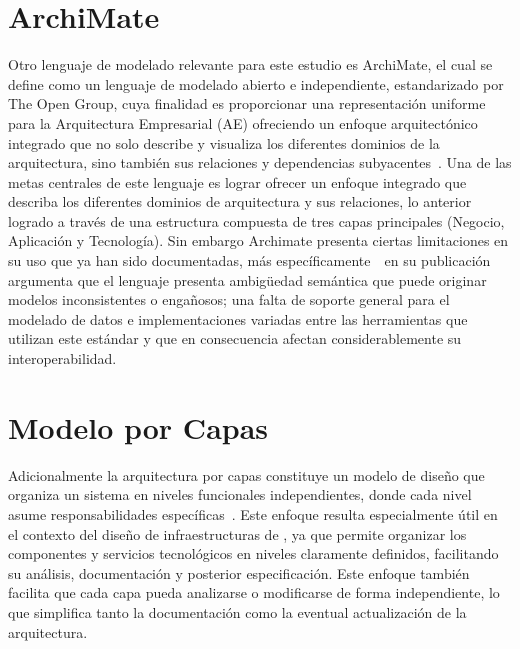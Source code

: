 \section{ArchiMate}
Otro lenguaje de modelado relevante para este estudio es ArchiMate, el cual se define como un lenguaje de modelado abierto e independiente, estandarizado por The Open Group, cuya finalidad es proporcionar una representación uniforme para la Arquitectura Empresarial (AE) ofreciendo un enfoque arquitectónico integrado que no solo describe y visualiza los diferentes dominios de la arquitectura, sino también sus relaciones y dependencias subyacentes~\citep{Vicente01}. Una de las metas centrales de este lenguaje es lograr ofrecer un enfoque integrado que describa los diferentes dominios de arquitectura y sus relaciones, lo anterior logrado a través de una estructura compuesta de tres capas principales (Negocio, Aplicación y Tecnología)\citep{Patzwahl01}. 
Sin embargo Archimate presenta ciertas limitaciones en su uso que ya han sido documentadas, más específicamente~\cite{Nilus01}~en su publicación argumenta que el lenguaje presenta ambigüedad semántica que puede originar modelos inconsistentes o engañosos; una falta de soporte general para el modelado de datos e implementaciones variadas entre las herramientas que utilizan este estándar y que en consecuencia afectan considerablemente su interoperabilidad.

\section{Modelo por Capas}
\noindent
Adicionalmente la arquitectura por capas constituye un modelo de diseño que organiza un sistema en niveles funcionales independientes, donde cada nivel asume responsabilidades específicas~\citep{Spray2023}. Este enfoque resulta especialmente útil en el contexto del diseño de infraestructuras de \TI, ya que permite organizar los componentes y servicios tecnológicos en niveles claramente definidos, facilitando su análisis, documentación y posterior especificación. Este enfoque también facilita que cada capa pueda analizarse o modificarse de forma independiente, lo que simplifica tanto la documentación como la eventual actualización de la arquitectura.

